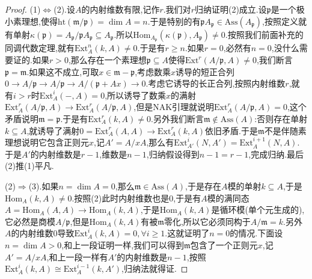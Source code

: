 \begin{proof}
	
	(1)$\Leftrightarrow$(2).设$A$的内射维数有限,记作$r$.我们对$r$归纳证明(2)成立.设$\mathfrak{p}$是一个极小素理想,使得$\mathrm{ht}(\mathfrak{m}/\mathfrak{p})=\dim A=n$.于是特别的有$\mathfrak{p}A_{\mathfrak{p}}\in\mathrm{Ass}(A_{\mathfrak{p}})$,按照定义就有单射$\kappa(\mathfrak{p})=A_{\mathfrak{p}}/\mathfrak{p}A_{\mathfrak{p}}\subseteq A_{\mathfrak{p}}$.所以$\mathrm{Hom}_{A_{\mathfrak{p}}}(\kappa(\mathfrak{p}),A_{\mathfrak{p}})\not=0$.按照我们前面补充的同调代数定理,就有$\mathrm{Ext}_A^n(k,A)\not=0$.于是有$r\ge n$.如果$r=0$,必然有$n=0$,没什么需要证的.如果$r>0$,那么存在一个素理想$\mathfrak{p}\subseteq A$使得$\mathrm{Ext}^r(A/\mathfrak{p},A)\not=0$,我们断言$\mathfrak{p}=\mathfrak{m}$.如果这不成立,可取$x\in\mathfrak{m}-\mathfrak{p}$,考虑数乘$x$诱导的短正合列$0\to A/\mathfrak{p}\to A/\mathfrak{p}\to A/(\mathfrak{p}+Ax)\to0$.考虑它诱导的长正合列,按照内射维数$r$,就有$i>r$时$\mathrm{Ext}^i_A(-,A)=0$,所以诱导了数乘$x$的满射$\mathrm{Ext}_A^r(A/\mathfrak{p},A)\to\mathrm{Ext}_A^r(A/\mathfrak{p},A)$,但是NAK引理就说明$\mathrm{Ext}_A^r(A/\mathfrak{p},A)=0$,这个矛盾说明$\mathfrak{m}=\mathfrak{p}$.于是有$\mathrm{Ext}_A^r(k,A)\not=0$.另外我们断言$\mathfrak{m}\not\in\mathrm{Ass}(A)$:否则存在单射$k\subseteq A$,就诱导了满射$0=\mathrm{Ext}_A^r(A,A)\to\mathrm{Ext}_A^r(k,A)$依旧矛盾.于是$\mathfrak{m}$不是伴随素理想说明它包含正则元$x$,记$A'=A/xA$,那么有$\mathrm{Ext}_{A'}^i(N,A')=\mathrm{Ext}_A^{i+1}(N,A)$.于是$A'$的内射维数是$r-1$,维数是$n-1$,归纳假设得到$n-1=r-1$,完成归纳.最后(2)推(1)平凡.
	
	\qquad
	
	(2)$\Rightarrow$(3).如果$n=\dim A=0$,那么$\mathfrak{m}\in\mathrm{Ass}(A)$,于是存在$A$模的单射$k\subseteq A$,于是$\mathrm{Hom}_A(k,A)\not=0$.按照(2)此时内射维数也是0,于是有$A$模的满同态$A=\mathrm{Hom}_A(A,A)\to\mathrm{Hom}_A(k,A)$,于是$\mathrm{Hom}_A(k,A)$是循环模(单个元生成的),它必然是商模$A/\mathfrak{p}$,但是$\mathrm{Hom}_A(k,A)$有被$\mathfrak{m}$零化,所以它必须同构于$A/\mathfrak{m}=k$.另外$A$的内射维数0导致$\mathrm{Ext}^i_A(k,A)=0,\forall i\ge1$.这就证明了$n=0$的情况.下面设$n=\dim A>0$,和上一段证明一样,我们可以得到$\mathfrak{m}$包含了一个正则元$x$,记$A'=A/xA$,和上一段一样有$A'$的内射维数是$n-1$,按照$\mathrm{Ext}_A^i(k,A)\cong\mathrm{Ext}_A^{i-1}(k,A')$,归纳法就得证.
	
	\qquad
	

\end{proof}
